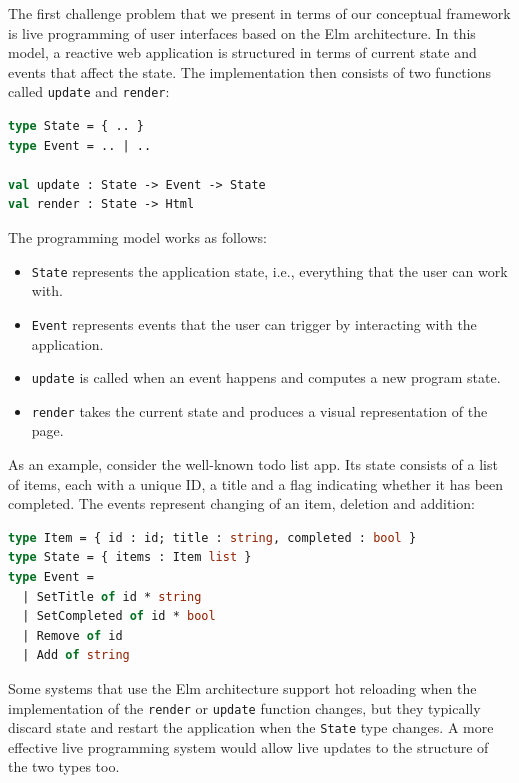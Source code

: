 \documentclass[english,submission]{programming}
\begin{document}
The first challenge problem that we present in terms of our conceptual framework is live programming
of user interfaces based on the Elm architecture. In this model, a reactive web application is
structured in terms of current state and events that affect the state. The implementation then
consists of two functions called \texttt{update} and \texttt{render}:

\begin{lstlisting}[language=ml,morekeywords={on}]
type State = { .. }
type Event = .. | ..

val update : State -> Event -> State
val render : State -> Html
\end{lstlisting}

\noindent
The programming model works as follows:

\begin{itemize}
\setlength\itemsep{0em}
\item \texttt{State} represents the application state, i.e., everything that the user can work with.
\item \texttt{Event} represents events that the user can trigger by interacting with the application.
\item \texttt{update} is called when an event happens and computes a new program state.
\item \texttt{render} takes the current state and produces a visual representation of the page.
\end{itemize}

\noindent
As an example, consider the well-known todo list app. Its state consists of a list of items,
each with a unique ID, a title and a flag indicating whether it has been completed.
The events represent changing of an item, deletion and addition:

\begin{lstlisting}[language=ml]
type Item = { id : id; title : string, completed : bool }
type State = { items : Item list }
type Event =
  | SetTitle of id * string
  | SetCompleted of id * bool
  | Remove of id
  | Add of string
\end{lstlisting}

\noindent
Some systems that use the Elm architecture support hot reloading when the
implementation of the \texttt{render} or \texttt{update} function changes, but they typically
discard state and restart the application when the \texttt{State} type changes. A more effective
live programming system would allow live updates to the structure of the two types too.
\end{document}
